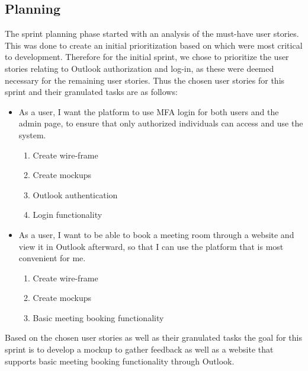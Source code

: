 \subsection*{Planning}
The sprint planning phase started with an analysis of the must-have user stories. 
This was done to create an initial prioritization based on which were most critical to development.
Therefore for the initial sprint, we chose to prioritize the user stories relating to Outlook authorization and log-in, as these were deemed necessary for the remaining user stories. 
Thus the chosen user stories for this sprint and their granulated tasks are as follows:
\begin{itemize}
    \item As a user, I want the platform to use MFA login for both users and the admin page, to ensure that only authorized individuals can access and use the system.
    \begin{enumerate}
        \item Create wire-frame
        \item Create mockups
        \item Outlook authentication
        \item Login functionality
    \end{enumerate}
    \item As a user, I want to be able to book a meeting room through a website and view it in Outlook afterward, so that I can use the platform that is most convenient for me.
    \begin{enumerate}
        \item Create wire-frame
        \item Create mockups
        \item Basic meeting booking functionality
    \end{enumerate}   
\end{itemize}

Based on the chosen user stories as well as their granulated tasks the goal for this sprint is to develop a mockup to gather feedback as well as a website that supports basic meeting booking functionality through Outlook.




